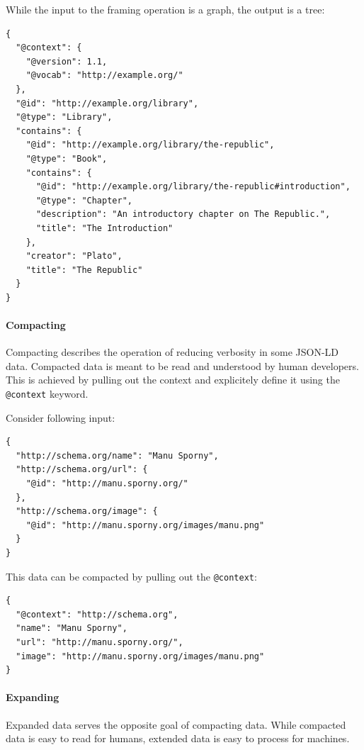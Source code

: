 While the input to the framing operation is a graph, the output is a tree:

\lstset{language=JSON}
\begin{lstlisting}[caption=Framed data of a library]
{
  "@context": {
    "@version": 1.1,
    "@vocab": "http://example.org/"
  },
  "@id": "http://example.org/library",
  "@type": "Library",
  "contains": {
    "@id": "http://example.org/library/the-republic",
    "@type": "Book",
    "contains": {
      "@id": "http://example.org/library/the-republic#introduction",
      "@type": "Chapter",
      "description": "An introductory chapter on The Republic.",
      "title": "The Introduction"
    },
    "creator": "Plato",
    "title": "The Republic"
  }
}
\end{lstlisting}

\paragraph{Compacting}\label{jsonldcompacting}

Compacting describes the operation of reducing verbosity in some JSON-LD data. Compacted data is meant to be read and understood by human developers. This is achieved by pulling out the context and explicitely define it using the \lstinline{@context} keyword.

Consider following input:

\lstset{language=JSON}
\begin{lstlisting}[caption=Verbose data of a person]
{
  "http://schema.org/name": "Manu Sporny",
  "http://schema.org/url": {
    "@id": "http://manu.sporny.org/"
  },
  "http://schema.org/image": {
    "@id": "http://manu.sporny.org/images/manu.png"
  }
}
\end{lstlisting}

This data can be compacted by pulling out the \lstinline{@context}:

\lstset{language=JSON}
\begin{lstlisting}[caption=Compacted and easy-to-read data of a person]
{
  "@context": "http://schema.org",
  "name": "Manu Sporny",
  "url": "http://manu.sporny.org/",
  "image": "http://manu.sporny.org/images/manu.png"
}
\end{lstlisting}

\paragraph{Expanding}\label{jsonldextending}
Expanded data serves the opposite goal of compacting data. While compacted data is easy to read for humans, extended data is easy to process for machines.


